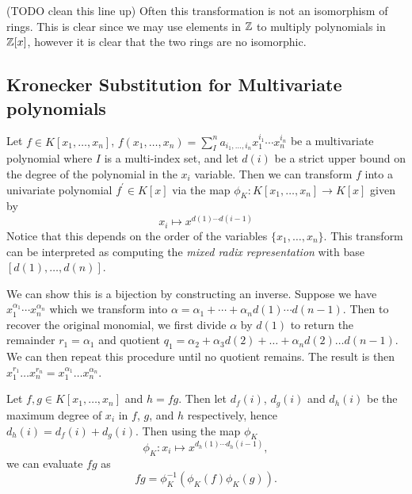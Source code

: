 (TODO clean this line up)
Often this transformation is not an isomorphism of rings. This is clear since we may use elements in ${\mathbb Z}$ to multiply polynomials in ${\mathbb Z}[x]$, however it is clear that the two rings are no isomorphic. 

\medskip 

\subsection{Kronecker Substitution for Multivariate polynomials}

Let $f \in K[x_1, \ldots, x_n]$, $f(x_1, \ldots, x_n) = \sum^n_{I}a_{i_1, \ldots, i_n}x_1^{i_1}\cdots x_n^{i_n}$ be a multivariate polynomial where $I$ is a multi-index set, and let $d(i)$ be a strict upper bound on the degree of the polynomial in the $x_i$ variable. Then we can transform $f$ into a univariate polynomial $f^\prime \in K[x]$ via the map $\phi_K: K[x_1, \ldots, x_n] \to K[x]$ given by
\[
    x_i \mapsto x^{d(1) \cdots d(i-1)}
\]
Notice that this depends on the order of the variables $\{x_1, \ldots, x_n\}$. This transform can be interpreted as computing the \emph{mixed radix representation} with base $[d(1), \ldots, d(n)]$.

We can show this is a bijection by constructing an inverse. Suppose we have $x_1^{\alpha_1}\cdots x_n^{\alpha_n}$ which we transform into $\alpha = \alpha_1 + \cdots + \alpha_n d(1) \cdots d(n-1)$. Then to recover the original monomial, we first divide $\alpha$ by $d(1)$ to return the remainder $r_1 = \alpha_1$ and quotient $q_1 = \alpha_2 + \alpha_3 d(2) + \ldots + \alpha_n d(2) \ldots d(n-1)$. We can then repeat this procedure until no quotient remains. The result is then $x_1^{r_1} \ldots x_n^{r_n} = x_1^{\alpha_1} \ldots x_n^{\alpha_n}$.

\begin{proposition}
    Let $f, g \in K[x_1, \ldots, x_n]$ and $h = fg$. Then let $d_f(i)$, $d_g(i)$ and $d_h(i)$ be the maximum degree of $x_i$ in $f$, $g$, and $h$ respectively, hence $d_h(i) = d_f(i) + d_g(i)$. Then using the map $\phi_K$
    \[
        \phi_K: x_i \mapsto x^{d_h(1) \cdots d_h(i-1)},
    \]
    we can evaluate $fg$ as
    \[
        f g= \phi^{-1}_K(\phi_K(f) \phi_K(g)).
    \]
\end{proposition}

